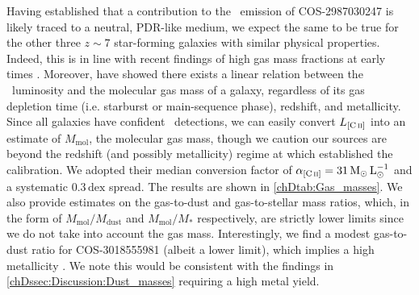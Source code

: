 Having established that a contribution to the \CIILam\ emission of COS-2987030247 is likely traced to a neutral, PDR-like medium, we expect the same to be true for the other three $z \sim 7$ star-forming galaxies with similar physical properties. Indeed, this is in line with recent findings of high  gas mass fractions at early times \citep{2021ApJ...922..147H, 2022ApJ...934L..27H}. Moreover, \citet{2018MNRAS.481.1976Z} have showed there exists a linear relation between the \CII\ luminosity and the molecular gas mass of a galaxy, regardless of its gas depletion time (i.e. starburst or main-sequence phase), redshift, and metallicity. Since all galaxies have confident \CII\ detections, we can easily convert $L_\CII$ into an estimate of $M_\text{mol}$, the molecular gas mass, though we caution our sources are beyond the redshift (and possibly metallicity) regime at which \citeauthor{2018MNRAS.481.1976Z} established the calibration. We adopted their median conversion factor of $\alpha_\CII = 31 \, \mathrm{M_\odot \, L_\odot^{-1}}$ and a systematic $0.3 \, \mathrm{dex}$ spread. The results are shown in \cref{chDtab:Gas_masses}. We also provide estimates on the gas-to-dust and gas-to-stellar mass ratios, which, in the form of $M_\text{mol}/M_\text{dust}$ and $M_\text{mol}/M_*$ respectively, are strictly lower limits since we do not take into account the  gas mass. Interestingly, we find a modest gas-to-dust ratio for COS-3018555981 (albeit a lower limit), which implies a high metallicity \citep{2014A&A...563A..31R}. We note this would be consistent with the findings in \cref{chDssec:Discussion:Dust_masses} requiring a high metal yield.

